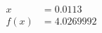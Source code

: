 \documentclass[preview]{standalone}
\begin{document}
\begin{align*}
x &= 0.0113\\f(x) &= 4.0269992
\end{align*}
\end{document}
